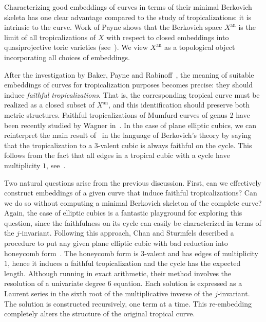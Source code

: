 \documentclass[11pt]{amsart}
\numberwithin{equation}{section}
\theoremstyle{plain}
\theoremstyle{definition}
\theoremstyle{remark}
\begin{document}
Characterizing good embeddings of curves in terms of their minimal
Berkovich skeleta has one clear advantage compared to the study of
tropicalizations: it is intrinsic to the curve.  Work of Payne shows
that the Berkovich space $X^\operatorname{an}$ is the limit of all
tropicalizations of $X$ with respect to closed embeddings into
quasiprojective toric varieties (see~\cite[Theorem 4.2]{Pay09}). We
view $X^\operatorname{an}$ as a topological object incorporating all choices of
embeddings.

After the investigation by Baker, Payne and Rabinoff~\cite{BPR11}, the
meaning of suitable embeddings of curves for tropicalization purposes
becomes precise: they should induce \emph{faithful
  tropicalizations}. That is, the corresponding tropical curve must be
realized as a closed subset of $X^\operatorname{an}$, and this identification
should preserve both metric structures. Faithful tropicalizations of
Mumfurd curves of genus 2 have been recently studied by Wagner
in~\cite{Till14}. In the case of plane elliptic cubics, we can
reinterpret the main result of~\cite{KMM07} in the language of
Berkovich's theory by saying that the tropicalization to a $3$-valent
cubic is always faithful on the cycle. This follows from the fact that
all edges in a tropical cubic with a cycle have multiplicity $1$,
see~\cite[Theorem 6.24 and 6.25]{BPR11}.

Two natural questions arise from the previous discussion. First, can
we effectively construct embeddings of a given curve that induce
faithful tropicalizations? Can we do so without computing a minimal
Berkovich skeleton of the complete curve?  Again, the case of elliptic
cubics is a fantastic playground for exploring this question, since
the faithfulness on its cycle can easily be characterized in terms of
the $j$-invariant. Following this approach, Chan and Sturmfels
described a procedure to put any given plane elliptic cubic with bad
reduction into honeycomb form~\cite{CS13}. The honeycomb form is
$3$-valent and has edges of multiplicity $1$, hence it induces a
faithful tropicalization and the cycle has the expected
length. Although running in exact arithmetic, their method involves
the resolution of a univariate degree 6 equation. Each solution is
expressed as a Laurent series in the sixth root of the multiplicative
inverse of the $j$-invariant. The solution is constructed recursively,
one term at a time.  This re-embedding completely alters the structure
of the original tropical curve.
\end{document}
